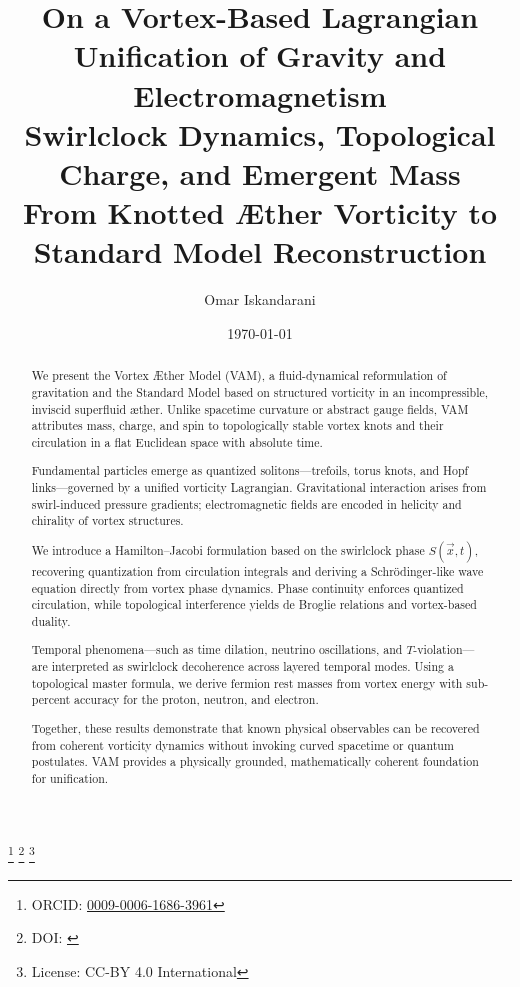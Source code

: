 \documentclass[12pt,aps,prd,onecolumn,nofootinbib,superscriptaddress]{revtex4-2}
\begin{document}
    \title{
        \textbf{On a Vortex-Based Lagrangian Unification of Gravity and Electromagnetism}\\[0.5em]
        \large Swirlclock Dynamics, Topological Charge, and Emergent Mass \\
        \normalsize From Knotted Æther Vorticity to Standard Model Reconstruction
    }
\author{Omar Iskandarani}
\thanks{ORCID: \href{https://orcid.org/0009-0006-1686-3961}{0009-0006-1686-3961}}
\thanks{DOI: \href{https://doi.org/\paperdoi}{\paperdoi}}
\thanks{License: CC-BY 4.0 International}

\date{\today}

    \maketitle
        \begin{abstract}
            We present the Vortex \AE{}ther Model (VAM), a fluid-dynamical reformulation of gravitation and the Standard Model based on structured vorticity in an incompressible, inviscid superfluid æther. Unlike spacetime curvature or abstract gauge fields, VAM attributes mass, charge, and spin to topologically stable vortex knots and their circulation in a flat Euclidean space with absolute time.

            Fundamental particles emerge as quantized solitons—trefoils, torus knots, and Hopf links—governed by a unified vorticity Lagrangian. Gravitational interaction arises from swirl-induced pressure gradients; electromagnetic fields are encoded in helicity and chirality of vortex structures.

            We introduce a Hamilton–Jacobi formulation based on the swirlclock phase \( S(\vec{x}, t) \), recovering quantization from circulation integrals and deriving a Schrödinger-like wave equation directly from vortex phase dynamics. Phase continuity enforces quantized circulation, while topological interference yields de Broglie relations and vortex-based duality.

            Temporal phenomena—such as time dilation, neutrino oscillations, and $T$-violation—are interpreted as swirlclock decoherence across layered temporal modes. Using a topological master formula, we derive fermion rest masses from vortex energy with sub-percent accuracy for the proton, neutron, and electron.

            Together, these results demonstrate that known physical observables can be recovered from coherent vorticity dynamics without invoking curved spacetime or quantum postulates. VAM provides a physically grounded, mathematically coherent foundation for unification.
        \end{abstract}
\end{document}
